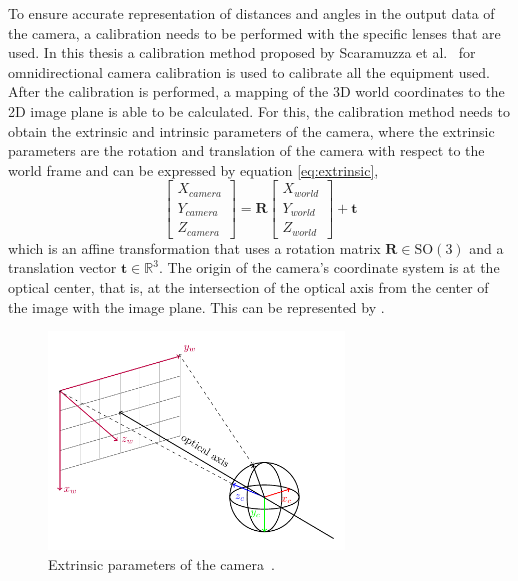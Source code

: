 To ensure accurate representation of distances and angles in the output data of the camera, a calibration needs to be performed with the specific lenses
that are used. In this thesis a calibration method proposed by Scaramuzza et al.~\cite{scaramuzzacalibration} for omnidirectional camera
calibration is used to calibrate all the equipment used. 
After the calibration is performed, a mapping of the 3D world coordinates to the 2D image plane is able to be calculated.
For this, the calibration method needs to obtain the extrinsic
and intrinsic parameters of the camera, where the extrinsic parameters are the rotation and translation of the camera with respect to the world frame and can be expressed by equation \ref{eq:extrinsic},
\begin{equation}
	\begin{bmatrix}
		X_{camera} \\
		Y_{camera} \\
		Z_{camera}
	\end{bmatrix}
	= \mathbf{R} 
  \begin{bmatrix}
	X_{world} \\
	Y_{world} \\
	Z_{world}
  \end{bmatrix}
  + \mathbf{t}
  \label{eq:extrinsic}
\end{equation}
which is an affine transformation that uses a rotation matrix $\mathbf{R} \in \text{SO}(3)$ and a translation vector
$\mathbf{t} \in \mathbb{R}^3$. The origin of the camera's coordinate system is at the optical center,
that is, at the intersection of the optical axis from the center of the image with the image plane. This can be represented by .

\begin{figure}[H]
  \centering
  \includegraphics[width=0.7\textwidth]{./fig/tikz/extrinsic.pdf}
  \caption{Extrinsic parameters of the camera~\cite{scaramuzzacalibration}.}
  \label{fig:camera_extrinsic}
\end{figure}

